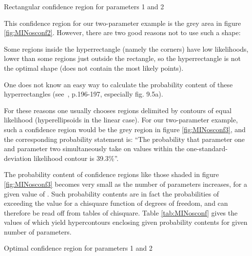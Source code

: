 \begin{Fighere}
\begin{center}
\mbox{}
\end{center}
\caption{Rectangular confidence region for parameters 1 and 2}
\label{fig:MINosconf2}
\end{Fighere}
 
This confidence region for our two-parameter example is the 
grey area in figure \ref{fig:MINosconf2}. 
However, there are two good reasons 
not to use such a shape:
 
\begin{OL}
\item Some regions inside the hyperrectangle (namely the corners) have 
      low likelihoods, lower than some regions just outside the rectangle, 
      so the hyperrectangle is not the optimal shape (does not contain the 
      most likely points).
\item One does not know an easy way to calculate the probability 
      content of these hyperrectangles (see~\cite{bib-EADIE}, p.196-197, 
      especially fig. 9.5a).
\end{OL} 

For these reasons one usually chooses regions delimited by contours 
of equal likelihood (hyperellipsoids in the linear case). For our 
two-parameter example, such a confidence region would be the grey
region in figure \ref{fig:MINosconf3}, and the corresponding probability 
statement is: ``The probability that parameter one and parameter two 
simultaneously take on values within the one-standard-deviation likelihood 
contour is 39.3\%''.
 
The probability content of confidence regions like those shaded in 
figure \ref{fig:MINosconf3} becomes very small as the number of parameters 
 increases, for a given value of . 
Such probability contents are in 
fact the probabilities of exceeding the value  for a chisquare 
function of  degrees of freedom, and can therefore be read off 
from tables of chisquare. 
Table \ref{tab:MINosconf} gives the values of  which 
yield hypercontours enclosing given probability contents for given 
number of parameters.
 
\newpage
\vspace*{-13mm}
\begin{Fighere}
\begin{center}
\mbox{}
\end{center}
\caption{Optimal confidence region for parameters 1 and 2}
\label{fig:MINosconf3}
\end{Fighere}
 
